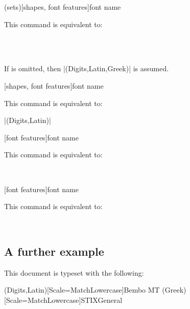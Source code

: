 \documentclass{ltxdockit}
\begin{document}
\begin{ltxsyntax}

  (sets)[shapes, font features]{font name}

  This command is equivalent to:

  \\
  \\

  If  is omitted, then |(Digits,Latin,Greek)| is assumed.

  [shapes, font features]{font name}

  This command is equivalent to:

  |(Digits,Latin)|

  [font features]{font name}

  This command is equivalent to:

  \\

  [font features]{font name}

  This command is equivalent to:

  \\

\end{ltxsyntax}

\subsection{A further example}

This document is typeset with the following:

\begin{example}
  \setmainfont[Numbers=OldStyle]{Sabon LT Std}
  \setmathsfont(Digits,Latin)[Scale=MatchLowercase]{Bembo MT}
  \setmathsfont(Greek)[Scale=MatchLowercase]{STIXGeneral}
    \setminwhitespace[750]
\end{example}
\end{document}
